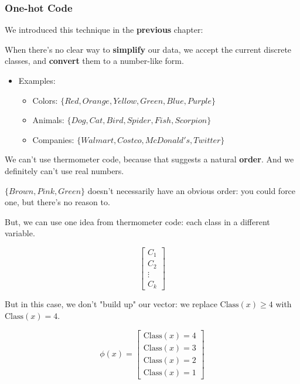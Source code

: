             \subsecdiv
            \subsubsection{One-hot Code}

                We introduced this technique in the \textbf{previous} chapter:
                
                When there's no clear way to \textbf{simplify} our data, we accept the current discrete classes, and \textbf{convert} them to a number-like form.

                \begin{itemize}
                    \item Examples:
                    \begin{itemize}
                        \item Colors: $\{Red, Orange, Yellow, Green, Blue, Purple\}$
                        \item Animals: $\{Dog, Cat, Bird, Spider, Fish, Scorpion\}$
                        \item Companies: $\{Walmart, Costco, McDonald's, Twitter\}$
                    \end{itemize}
                \end{itemize}

                We can't use thermometer code, because that suggests a natural \textbf{order}. And we definitely can't use real numbers.

                \miniex $\{Brown, Pink, Green\}$ doesn't necessarily have an obvious order: you could force one, but there's no reason to.

                But, we can use one idea from thermometer code: each class in a different variable.
        
                \begin{equation}
                    \begin{bmatrix}
                      C_1\\C_2\\ \vdots \\ C_k
                    \end{bmatrix}
                \end{equation}

                But in this case, we don't "build up" our vector: we replace $\text{Class}(x)\geq 4$ with $\text{Class}(x)= 4$.

                \begin{equation}
                    \phi(x) =
                    \begin{bmatrix}
                        \text{Class}(x) = 4 \\
                        \text{Class}(x) = 3\\
                        \text{Class}(x) = 2\\
                        \text{Class}(x) = 1
                    \end{bmatrix}
                \end{equation}
                
